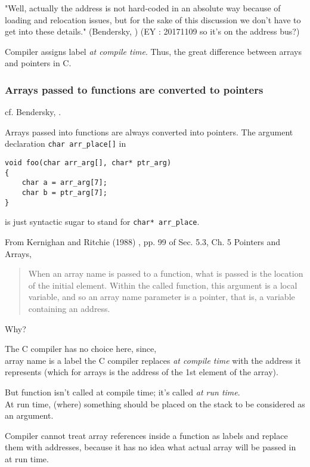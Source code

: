 \documentclass[10pt]{amsart}
\begin{document}
\begin{multicols*}{2}
"Well, actually the address is not hard-coded in an absolute way because of loading and relocation issues, but for the sake of this discussion we don't have to get into these details." (Bendersky, \cite{Bend}) (EY : 20171109 so it's on the address bus?)

Compiler assigns label \emph{at compile time}.  Thus, the great difference between arrays and pointers in C.  

\subsubsection{Arrays passed to functions are converted to pointers}  

cf. Bendersky, \cite{Bend}.  

Arrays passed into functions are always converted into pointers.  The argument declaration \verb|char arr_place[]| in  

\begin{lstlisting}
void foo(char arr_arg[], char* ptr_arg)
{
	char a = arr_arg[7];
	char b = ptr_arg[7];
}
\end{lstlisting} 

is just syntactic sugar to stand for \verb|char* arr_place|.  

From Kernighan and Ritchie (1988) \cite{KeRi1988}, pp. 99 of Sec. 5.3, Ch. 5 Pointers and Arrays,  

\begin{quotation}
	When an array name is passed to a function, what is passed is the location of the initial element.  Within the called function, this argument is a local variable, and so an array name parameter is a pointer, that is, a variable containing an address.  
	\end{quotation}

Why?  

The C compiler has no choice here, since, \\
array name is a label the C compiler replaces \emph{at compile time}  with the address it represents (which for arrays is the address of the 1st element of the array).  

But function isn't called at compile time; it's called \emph{at run time}.  \\
At run time, (where) something should be placed on the stack to be considered as an argument.  

Compiler cannot treat array references inside a function as labels and replace them with addresses, because it has no idea what actual array will be passed in at run time.  


\end{multicols*}
\end{document}
